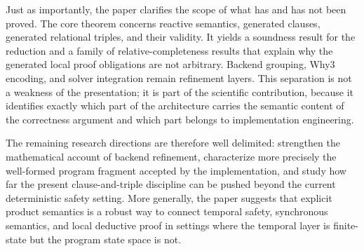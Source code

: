 \documentclass[11pt,a4paper]{article}
\begin{document}
Just as importantly, the paper clarifies the scope of what has and has not been
proved. The core theorem concerns reactive semantics, generated clauses,
generated relational triples, and their validity. It yields a soundness result
for the reduction and a family of relative-completeness results that explain
why the generated local proof obligations are not arbitrary. Backend grouping,
Why3 encoding, and solver integration remain refinement layers. This
separation is not a weakness of the presentation; it is part of the scientific
contribution, because it identifies exactly which part of the architecture
carries the semantic content of the correctness argument and which part belongs
to implementation engineering.

The remaining research directions are therefore well delimited: strengthen the
mathematical account of backend refinement, characterize more precisely the
well-formed program fragment accepted by the implementation, and study how far
the present clause-and-triple discipline can be pushed beyond the current
deterministic safety setting. More generally, the paper suggests that explicit
product semantics is a robust way to connect temporal safety, synchronous
semantics, and local deductive proof in settings where the temporal layer is
finite-state but the program state space is not.
\end{document}
